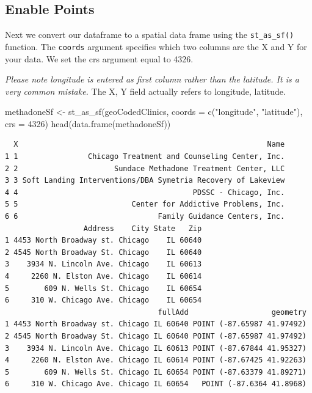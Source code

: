 \documentclass[
  letterpaper,
  DIV=11,
  numbers=noendperiod]{scrreprt}
\newenvironment{Shaded}{\begin{snugshade}}{\end{snugshade}}
\newcommand{\AttributeTok}[1]{\textcolor[rgb]{0.40,0.45,0.13}{#1}}
\newcommand{\DecValTok}[1]{\textcolor[rgb]{0.68,0.00,0.00}{#1}}
\newcommand{\FunctionTok}[1]{\textcolor[rgb]{0.28,0.35,0.67}{#1}}
\newcommand{\NormalTok}[1]{\textcolor[rgb]{0.00,0.23,0.31}{#1}}
\newcommand{\OtherTok}[1]{\textcolor[rgb]{0.00,0.23,0.31}{#1}}
\newcommand{\StringTok}[1]{\textcolor[rgb]{0.13,0.47,0.30}{#1}}
\begin{document}
\subsection{Enable Points}\label{enable-points}

Next we convert our dataframe to a spatial data frame using the
\texttt{st\_as\_sf()} function. The \texttt{coords} argument specifies
which two columns are the X and Y for your data. We set the crs argument
equal to 4326.

\emph{Please note longitude is entered as first column rather than the
latitude. It is a very common mistake.} The X, Y field actually refers
to longitude, latitude.

\begin{Shaded}
\begin{Highlighting}[]
\NormalTok{methadoneSf }\OtherTok{\textless{}{-}} \FunctionTok{st\_as\_sf}\NormalTok{(geoCodedClinics, }
                        \AttributeTok{coords =} \FunctionTok{c}\NormalTok{(}\StringTok{"longitude"}\NormalTok{, }\StringTok{"latitude"}\NormalTok{),}
                        \AttributeTok{crs =} \DecValTok{4326}\NormalTok{)}
\FunctionTok{head}\NormalTok{(}\FunctionTok{data.frame}\NormalTok{(methadoneSf))}
\end{Highlighting}
\end{Shaded}

\begin{verbatim}
  X                                                         Name
1 1                Chicago Treatment and Counseling Center, Inc.
2 2                      Sundace Methadone Treatment Center, LLC
3 3 Soft Landing Interventions/DBA Symetria Recovery of Lakeview
4 4                                        PDSSC - Chicago, Inc.
5 5                          Center for Addictive Problems, Inc.
6 6                                Family Guidance Centers, Inc.
                  Address    City State   Zip
1 4453 North Broadway st. Chicago    IL 60640
2 4545 North Broadway St. Chicago    IL 60640
3    3934 N. Lincoln Ave. Chicago    IL 60613
4     2260 N. Elston Ave. Chicago    IL 60614
5        609 N. Wells St. Chicago    IL 60654
6     310 W. Chicago Ave. Chicago    IL 60654
                                   fullAdd                   geometry
1 4453 North Broadway st. Chicago IL 60640 POINT (-87.65987 41.97492)
2 4545 North Broadway St. Chicago IL 60640 POINT (-87.65987 41.97492)
3    3934 N. Lincoln Ave. Chicago IL 60613 POINT (-87.67844 41.95327)
4     2260 N. Elston Ave. Chicago IL 60614 POINT (-87.67425 41.92263)
5        609 N. Wells St. Chicago IL 60654 POINT (-87.63379 41.89271)
6     310 W. Chicago Ave. Chicago IL 60654   POINT (-87.6364 41.8968)
\end{verbatim}
\end{document}
